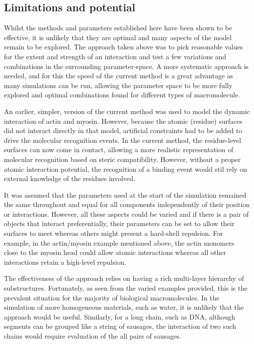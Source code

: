 \subsection{Limitations and potential}

Whilst the methods and parameters established here have been shown to be
effective, it is unlikely that they are optimal and many aspects of the
model remain to be explored.    The approach taken above was to pick
reasonable values for the extent and strength of an interaction and test
a few variations and combinations in the surrounding parameter-space.
A more systematic approach is needed, and for this the speed of the current
method is a great advantage as many simulations can be run, allowing the
parameter space to be more fully explored and optimal combinations found
for different types of macromolecule.

An earlier, simpler, version of the current method was used to model the
dynamic interaction of actin and myosin.   However, because the atomic (residue)
surfaces did not interact directly in that model, artificial constraints had
to be added to drive the molecular recognition events.  In the current
method, the residue-level surfaces can now come in contact, allowing a more
realistic representation of molecular recognition based on steric compatibility.
However, without a proper atomic interaction potential, the recognition of 
a binding event would stil rely on external knowledge of the residues involved.

It was assumed that the parameters used at the start of the simulation remained
the same throughout and equal for all components independently of their
position or interactions.   However, all these aspects could be varied and
if there is a pair of objects that interact preferentially, their parameters
can be set to allow their surfaces to meet whereas others might present a
hard-shell repulsion.  For example, in the actin/myosin example mentioned
above, the actin monomers close to the myosin head could allow atomic
interactions whereas all other interactions retain a high-level repulsion.

The effectiveness of the approach relies on having a rich multi-layer
hierarchy of substructures.   Fortunately, as seen from the varied examples
provided, this is the prevalent situation for the majority of biological
macromolecules.   In the simulation of more homogeneous materials, such
as water, it is unlikely that the approach would be useful.  Similarly, for
a long chain, such as DNA, although segments can be grouped like a string
of sausages, the interaction of two such chains would require evaluation
of the all pairs of sausages.

